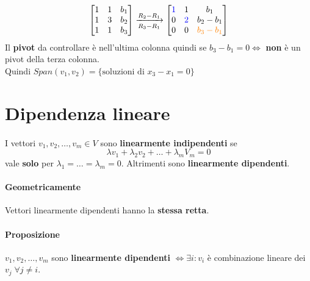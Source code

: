 \documentclass[a4paper, 12pt]{report}
\begin{document}
\begin{enumerate}
                            $$
                            \begin{bmatrix}
                                1 & 1 & b_1\\
                                1 & 3 & b_2\\
                                1 & 1 & b_3
                            \end{bmatrix}
                            \xrightarrow[R_3-R_1]{R_2-R_1}
                            \begin{bmatrix}
                                \textcolor{blue}{1} & 1 & b_1\\
                                0 & \textcolor{blue}{2} & b_2-b_1\\
                                0 & 0 & \textcolor{orange}{b_3-b_1}
                            \end{bmatrix}
                            $$
                            Il \textbf{pivot} da controllare è nell'ultima colonna quindi se $b_3-b_1=0 \Leftrightarrow$ \textbf{non} è un pivot della terza colonna.\\
                            Quindi $Span(v_1,v_2)=\{\text{soluzioni di }x_3-x_1=0\}$
                    \end{enumerate}
        \section{Dipendenza lineare}
            \paragraph{}I vettori $v_1,v_2,\dots,v_m \in V$ sono \textbf{linearmente indipendenti} se
            $$\lambda v_1+\lambda_2 v_2+\dots+\lambda_m V_m = 0$$ vale \textbf{solo} per $\lambda_1=\dots=\lambda_m=0$.
            Altrimenti sono \textbf{linearmente dipendenti}.
            \paragraph{Geometricamente} Vettori linearmente dipendenti hanno la \textbf{stessa retta}.
            \paragraph{Proposizione} $v_1,v_2,\dots,v_m$ sono \textbf{linearmente dipendenti} $\Leftrightarrow \exists i : v_i$ è combinazione lineare dei $v_j\; \forall j\neq i$.
\end{document}
